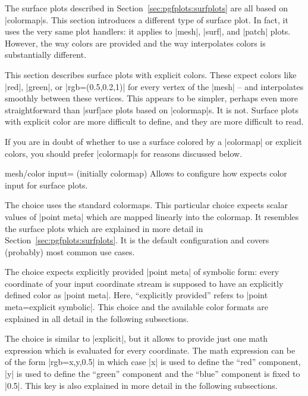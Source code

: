 {{

The surface plots described in Section~\ref{sec:pgfplots:surfplots} are all
based on |colormap|s. This section introduces a different type of surface plot.
In fact, it uses the very same plot handlers: it applies to |mesh|, |surf|, and
|patch| plots. However, the way colors are provided and the way \PGFPlots{}
interpolates colors is substantially different.

This section describes surface plots with explicit colors. These expect colors
like |red|, |green|, or |rgb=(0.5,0.2,1)| for every vertex of the |mesh| -- and
interpolates smoothly between these vertices. This appears to be simpler,
perhaps even more straightforward than |surf|ace plots based on |colormap|s. It
is not. Surface plots with explicit color are more difficult to define, and
they are more difficult to read.

If you are in doubt of whether to use a surface colored by a |colormap| or
explicit colors, you should prefer |colormap|s for reasons discussed below.

\begin{pgfplotskey}{mesh/color input= (initially colormap)}
    Allows to configure how \PGFPlots{} expects color input for surface plots.

    The choice  uses the standard colormaps. This
    particular choice expects scalar values of |point meta| which are mapped
    linearly into the colormap. It resembles the surface plots which are
    explained in more detail in Section~\ref{sec:pgfplots:surfplots}. It is the
    default configuration and covers (probably) most common use cases.

    The choice  expects explicitly provided |point meta|
    of symbolic form: every coordinate of your input coordinate stream is
    supposed to have an explicitly defined color as |point meta|. Here,
    ``explicitly provided'' refers to |point meta=explicit symbolic|. This
    choice and the available color formats are explained in all detail in the
    following subsections.

    The choice  is similar to |explicit|, but
    it allows to provide just one math expression which is evaluated for every
    coordinate. The math expression can be of the form |rgb=x,y,0.5| in which
    case |x| is used to define the ``red'' component, |y| is used to define the
    ``green'' component and the ``blue'' component is fixed to |0.5|. This key
    is also explained in more detail in the following subsections.
\end{pgfplotskey}

}}
